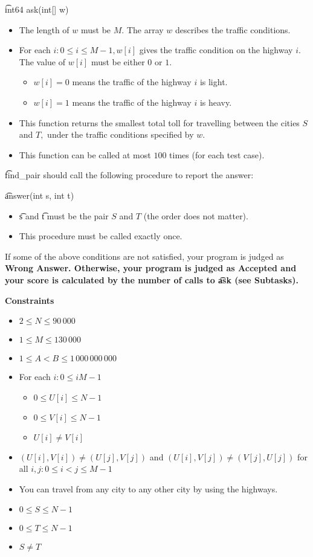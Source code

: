 \t{int64 ask(int[] w)}

\begin{itemize}
\item The length of $w$ must be $M.$ The array $w$ describes the traffic conditions. 
\item For each $i: 0 \le i \le M-1, w[i]$ gives the traffic condition on the highway $i.$ The value of $w[i]$ must be either $0$ or $1.$ 
\begin{itemize}
\item $w[i] = 0$ means the traffic of the highway $i$ is light. 
\item $w[i] = 1$ means the traffic of the highway $i$ is heavy. 
\end{itemize}
\item This function returns the smallest total toll for travelling between the cities $S$ and $T,$ under the traffic conditions specified by $w.$ 
\item This function can be called at most $100$ times (for each test case).
\end{itemize}

\t{find_pair} should call the following procedure to report the answer:

\t{answer(int s, int t)}

\begin{itemize}
\item \t{s} and \t{t} must be the pair $S$ and $T$ (the order does not matter). 
\item This procedure must be called exactly once.
\end{itemize}

If some of the above conditions are not satisfied, your program is judged as \bf{Wrong Answer}. Otherwise, your program is judged as \bf{Accepted} and your score is calculated by the number of calls to \t{ask} (see Subtasks).

\bf{Constraints}

\begin{itemize}
\item $2 \le N \le 90\,000$
\item $1 \le M \le 130\,000$
\item $1 \le A < B \le 1\,000\,000\,000$
\item For each $i: 0 \le i M-1$
\begin{itemize}
\item $0 \le U[i] \le N-1$
\item $0 \le V[i] \le N-1$
\item $U[i] \neq V[i]$
\end{itemize}
\item $(U[i], V[i]) \neq (U[j], V[j])$ and  $(U[i], V[j]) \neq (V[j], U[j])$ for all $i,j: 0 \le i < j \le M-1$
\item You can travel from any city to any other city by using the highways.
\item $0 \le S \le N-1$
\item $0 \le T \le N-1$
\item $S \neq T$
\end{itemize}

